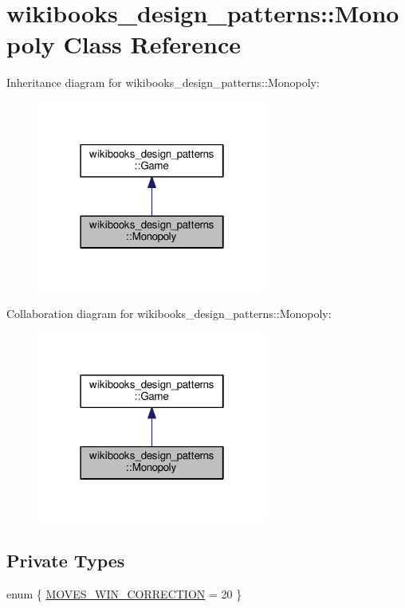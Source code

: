 \hypertarget{classwikibooks__design__patterns_1_1Monopoly}{}\section{wikibooks\+\_\+design\+\_\+patterns\+:\+:Monopoly Class Reference}
\label{classwikibooks__design__patterns_1_1Monopoly}


Inheritance diagram for wikibooks\+\_\+design\+\_\+patterns\+:\+:Monopoly\+:
\nopagebreak
\begin{figure}[H]
\begin{center}
\leavevmode
\includegraphics[width=214pt]{classwikibooks__design__patterns_1_1Monopoly__inherit__graph}
\end{center}
\end{figure}


Collaboration diagram for wikibooks\+\_\+design\+\_\+patterns\+:\+:Monopoly\+:
\nopagebreak
\begin{figure}[H]
\begin{center}
\leavevmode
\includegraphics[width=214pt]{classwikibooks__design__patterns_1_1Monopoly__coll__graph}
\end{center}
\end{figure}
\subsection*{Private Types}
\begin{DoxyCompactItemize}
\item 
enum \{ \hyperlink{classwikibooks__design__patterns_1_1Monopoly_a503a2b1818164ca11be7cc029dcc84e6a7f717a5237abe25eac65acce1a12d2f3}{M\+O\+V\+E\+S\+\_\+\+W\+I\+N\+\_\+\+C\+O\+R\+R\+E\+C\+T\+I\+ON} = 20
 \}
\end{DoxyCompactItemize}
